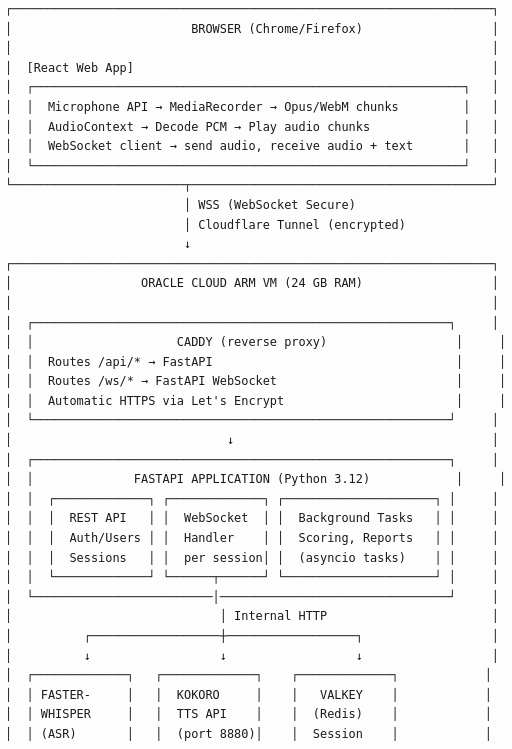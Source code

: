\documentclass[
  11pt,
]{article}
\begin{document}
\begin{lstlisting}
┌───────────────────────────────────────────────────────────────────┐
│                         BROWSER (Chrome/Firefox)                  │
│                                                                   │
│  [React Web App]                                                  │
│  ┌────────────────────────────────────────────────────────────┐   │
│  │  Microphone API → MediaRecorder → Opus/WebM chunks         │   │
│  │  AudioContext → Decode PCM → Play audio chunks             │   │
│  │  WebSocket client → send audio, receive audio + text       │   │
│  └────────────────────────────────────────────────────────────┘   │
└────────────────────────┬──────────────────────────────────────────┘
                         │ WSS (WebSocket Secure)
                         │ Cloudflare Tunnel (encrypted)
                         ↓
┌───────────────────────────────────────────────────────────────────┐
│                  ORACLE CLOUD ARM VM (24 GB RAM)                  │
│                                                                   │
│  ┌──────────────────────────────────────────────────────────┐     │
│  │                    CADDY (reverse proxy)                  │     │
│  │  Routes /api/* → FastAPI                                  │     │
│  │  Routes /ws/* → FastAPI WebSocket                         │     │
│  │  Automatic HTTPS via Let's Encrypt                        │     │
│  └──────────────────────────────────────────────────────────┘     │
│                              ↓                                    │
│  ┌──────────────────────────────────────────────────────────┐     │
│  │              FASTAPI APPLICATION (Python 3.12)            │     │
│  │  ┌─────────────┐ ┌─────────────┐ ┌─────────────────────┐ │     │
│  │  │  REST API   │ │  WebSocket  │ │  Background Tasks   │ │     │
│  │  │  Auth/Users │ │  Handler    │ │  Scoring, Reports   │ │     │
│  │  │  Sessions   │ │  per session│ │  (asyncio tasks)    │ │     │
│  │  └─────────────┘ └──────┬──────┘ └─────────────────────┘ │     │
│  └─────────────────────────│────────────────────────────────┘     │
│                             │ Internal HTTP                       │
│          ┌──────────────────┼──────────────────┐                  │
│          ↓                  ↓                  ↓                  │
│  ┌─────────────┐   ┌─────────────┐    ┌─────────────┐            │
│  │ FASTER-     │   │  KOKORO     │    │   VALKEY    │            │
│  │ WHISPER     │   │  TTS API    │    │  (Redis)    │            │
│  │ (ASR)       │   │  (port 8880)│    │  Session    │            │

\end{lstlisting}
\end{document}
